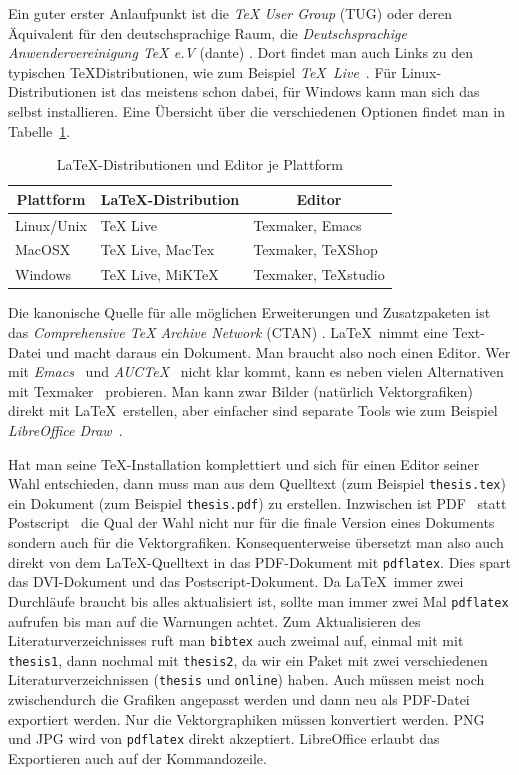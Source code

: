 \documentclass[11pt,a4paper]{report}
\begin{document}
Ein guter erster Anlaufpunkt ist die \textit{TeX User Group} (TUG) 
\cite{tug} oder deren Äquivalent für den deutschsprachige Raum, die 
\textit{Deutschsprachige Anwendervereinigung TeX e.V} (dante) \cite{dante}. 
Dort findet man auch Links zu den typischen \TeX\-Distributionen,
wie zum Beispiel \mbox{\textit{TeX Live}}~\cite{texlive}.
Für Linux-Distributionen ist das meistens schon dabei,
für Windows kann man sich das selbst installieren.
Eine Übersicht über die verschiedenen Optionen findet man 
in Tabelle~\ref{tab:disteditplattform}.
\begin{table}
\centering
\begin{tabular}{|l||l|l|}
\hline
\multicolumn{1}{|c|}{\textbf{Plattform}} & 
\multicolumn{1}{|c|}{\textbf{\LaTeX-Distribution}} & 
\multicolumn{1}{|c|}{\textbf{Editor}} \\\hline\hline
Linux/Unix & TeX Live         & Texmaker, Emacs \\\hline
MacOSX     & TeX Live, MacTex & Texmaker, TeXShop \\\hline
Windows    & TeX Live, MiKTeX & Texmaker, TeXstudio \\\hline   
\end{tabular}
\caption{\LaTeX-Distributionen und Editor je Plattform}
\label{tab:disteditplattform}
\end{table}
Die kanonische Quelle für alle möglichen Erweiterungen und Zusatzpaketen 
ist das 
\textit{Comprehensive TeX Archive Network} (CTAN) \cite{ctan}.
\LaTeX\ nimmt eine Text-Datei und macht daraus ein Dokument.
Man braucht also noch einen Editor. 
Wer mit \textit{Emacs}~\cite{emacs} und \textit{AUCTeX}~\cite{auctex} nicht 
klar kommt, kann es neben vielen Alternativen mit Texmaker~\cite{texmaker} 
probieren.
Man kann zwar Bilder (natürlich Vektorgrafiken) direkt mit \LaTeX\ erstellen,
aber einfacher sind separate Tools wie zum Beispiel 
\textit{LibreOffice Draw}~\cite{libreoffice}.

Hat man seine \TeX-Installation komplettiert und sich für einen Editor seiner
Wahl entschieden, dann muss man aus dem Quelltext 
(zum Beispiel \verb|thesis.tex|) ein Dokument (zum Beispiel \verb|thesis.pdf|) 
zu erstellen.
Inzwischen ist PDF~\cite{pdf} statt Postscript~\cite{postscript} 
die Qual der Wahl nicht nur für die finale Version eines Dokuments 
sondern auch für die Vektorgrafiken.
Konsequenterweise übersetzt man also auch direkt von dem \LaTeX-Quelltext in 
das PDF-Dokument mit \verb|pdflatex|. 
Dies spart das DVI-Dokument und das Postscript-Dokument.
Da \LaTeX\ immer zwei Durchläufe braucht bis alles aktualisiert ist, sollte 
man immer zwei Mal \verb|pdflatex| aufrufen bis man auf die Warnungen achtet. 
Zum Aktualisieren des Literaturverzeichnisses ruft man \verb|bibtex| auch 
zweimal auf, einmal mit mit \verb|thesis1|, dann nochmal mit \verb|thesis2|, 
da wir ein Paket mit zwei verschiedenen Literaturverzeichnissen 
(\verb|thesis| und \verb|online|) haben.
Auch müssen meist noch zwischendurch die Grafiken angepasst werden und dann 
neu als PDF-Datei exportiert werden. 
Nur die Vektorgraphiken müssen konvertiert werden.
PNG und JPG wird von \verb|pdflatex| direkt akzeptiert.
LibreOffice erlaubt das Exportieren auch auf der Kommandozeile.
\end{document}
